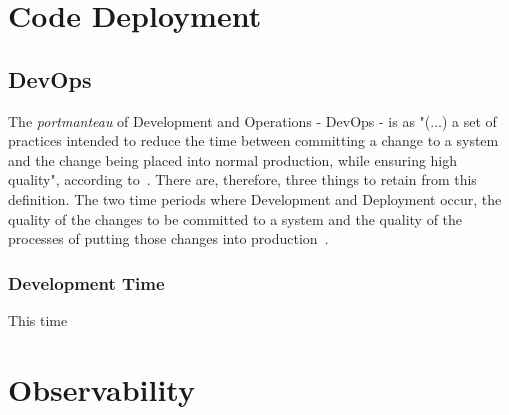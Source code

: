 \section{Code Deployment}\label{state-of-the-art:s:code-deployment}




\subsection{DevOps}\label{state-of-the-art:ss:devops}

The \textit{portmanteau} of Development and Operations - DevOps - is as "(...) a set of practices intended to reduce the time between committing a change to a system and the change being placed into normal production, while ensuring high quality", according to~\Parencite{bass_weber_zhu_2015}. There are, therefore, three things to retain from this definition. The two time periods where Development and Deployment occur, the quality of the changes to be committed to a system and the quality of the processes of putting those changes into production~\Parencite{sallin_kropp_anslow_quilty_meier_2021}.

\subsubsection{Development Time}
This time

\section{Observability}\label{state-of-the-art:s:observability}

